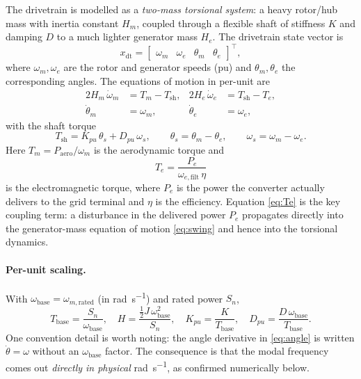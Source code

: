 The drivetrain is modelled as a \emph{two-mass torsional system}: a heavy
rotor/hub mass with inertia constant $H_m$, coupled through a flexible shaft of
stiffness $K$ and damping $D$ to a much lighter generator mass $H_e$. The
drivetrain state vector is
\begin{equation}
  x_{\mathrm{dt}} =
  \begin{bmatrix} \omega_m & \omega_e & \theta_m & \theta_e \end{bmatrix}^{\!\top},
  \label{eq:dt-states}
\end{equation}
where $\omega_m,\omega_e$ are the rotor and generator speeds (pu) and
$\theta_m,\theta_e$ the corresponding angles. The equations of motion in
per-unit are
\begin{align}
  2H_m\,\dot{\omega}_m &= T_m - T_{\mathrm{sh}}, &
  2H_e\,\dot{\omega}_e &= T_{\mathrm{sh}} - T_e, \label{eq:swing}\\
  \dot{\theta}_m &= \omega_m, &
  \dot{\theta}_e &= \omega_e, \label{eq:angle}
\end{align}
with the shaft torque
\begin{equation}
  T_{\mathrm{sh}} = K_{pu}\,\theta_s + D_{pu}\,\omega_s,
  \qquad \theta_s = \theta_m-\theta_e, \qquad \omega_s = \omega_m-\omega_e.
  \label{eq:shaft}
\end{equation}
Here $T_m = P_{\mathrm{aero}}/\omega_m$ is the aerodynamic torque and
\begin{equation}
  T_e = \frac{P_e}{\omega_{e,\mathrm{filt}}\,\eta}
  \label{eq:Te}
\end{equation}
is the electromagnetic torque, where $P_e$ is the power the converter actually
delivers to the grid terminal and $\eta$ is the efficiency. Equation
\eqref{eq:Te} is the key coupling term: a disturbance in the delivered power
$P_e$ propagates directly into the generator-mass equation of motion
\eqref{eq:swing} and hence into the torsional dynamics.

\paragraph{Per-unit scaling.}
With $\omega_{\mathrm{base}} = \omega_{m,\mathrm{rated}}$ (in
\si{\radian\per\second}) and rated power $S_n$,
\begin{equation}
  T_{\mathrm{base}} = \frac{S_n}{\omega_{\mathrm{base}}}, \quad
  H = \frac{\tfrac12 J\,\omega_{\mathrm{base}}^2}{S_n}, \quad
  K_{pu} = \frac{K}{T_{\mathrm{base}}}, \quad
  D_{pu} = \frac{D\,\omega_{\mathrm{base}}}{T_{\mathrm{base}}}.
  \label{eq:pu}
\end{equation}
One convention detail is worth noting: the angle derivative in
\eqref{eq:angle} is written $\dot{\theta} = \omega$ without an
$\omega_{\mathrm{base}}$ factor. The consequence is that the modal frequency
comes out \emph{directly in physical} \si{\radian\per\second}, as confirmed
numerically below.

